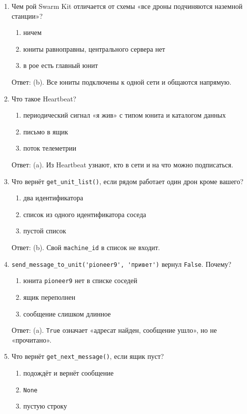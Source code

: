 \begin{enumerate}
  \item Чем рой Swarm Kit отличается от схемы «все дроны подчиняются наземной станции»?
    \begin{enumerate}[label=(\alph*)] \item ничем \item юниты равноправны, центрального сервера нет \item в рое есть главный юнит \end{enumerate}
    Ответ: (b). Все юниты подключены к одной сети и общаются напрямую.
  \item Что такое Heartbeat?
    \begin{enumerate}[label=(\alph*)] \item периодический сигнал «я жив» с типом юнита и каталогом данных \item письмо в ящик \item поток телеметрии \end{enumerate}
    Ответ: (a). Из Heartbeat узнают, кто в сети и на что можно подписаться.
  \item Что вернёт \verb|get_unit_list()|, если рядом работает один дрон кроме вашего?
    \begin{enumerate}[label=(\alph*)] \item два идентификатора \item список из одного идентификатора соседа \item пустой список \end{enumerate}
    Ответ: (b). Свой \texttt{machine\_id} в список не входит.
  \item \verb|send_message_to_unit('pioneer9', 'привет')| вернул \verb|False|. Почему?
    \begin{enumerate}[label=(\alph*)] \item юнита \texttt{pioneer9} нет в списке соседей \item ящик переполнен \item сообщение слишком длинное \end{enumerate}
    Ответ: (a). \verb|True| означает «адресат найден, сообщение ушло», но не «прочитано».
  \item Что вернёт \verb|get_next_message()|, если ящик пуст?
    \begin{enumerate}[label=(\alph*)] \item подождёт и вернёт сообщение \item \verb|None| \item пустую строку \end{enumerate}

\end{enumerate}
